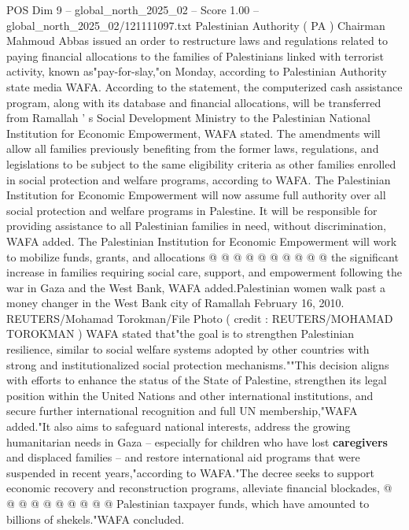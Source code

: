 \begin{textsample}{POS Dim 9 – global\_north\_2025\_02 – Score 1.00 – global\_north\_2025\_02/121111097.txt}  \label{ex:f9_pos_443}
Palestinian Authority ( PA ) Chairman Mahmoud Abbas issued an order to restructure laws and regulations related to paying financial allocations to the families of Palestinians linked with terrorist activity, known as"pay-for-slay,"on Monday, according to Palestinian Authority state media WAFA.
According to the statement, the computerized cash assistance program, along with its database and financial allocations, will be transferred from Ramallah ' s Social Development Ministry to the Palestinian National Institution for Economic Empowerment, WAFA stated.
The amendments will allow all families previously benefiting from the former laws, regulations, and legislations to be subject to the same eligibility criteria as other families enrolled in social protection and welfare programs, according to WAFA.
The Palestinian Institution for Economic Empowerment will now assume full authority over all social protection and welfare programs in Palestine.
It will be responsible for providing assistance to all Palestinian families in need, without discrimination, WAFA added.
The Palestinian Institution for Economic Empowerment will work to mobilize funds, grants, and allocations @ @ @ @ @ @ @ @ @ @ the significant increase in families requiring social care, support, and empowerment following the war in Gaza and the West Bank, WAFA added.Palestinian women walk past a money changer in the West Bank city of Ramallah February 16, 2010.
REUTERS/Mohamad Torokman/File Photo ( credit : REUTERS/MOHAMAD TOROKMAN ) WAFA stated that"the goal is to strengthen Palestinian resilience, similar to social welfare systems adopted by other countries with strong and institutionalized social protection mechanisms.""This decision aligns with efforts to enhance the status of the State of Palestine, strengthen its legal position within the United Nations and other international institutions, and secure further international recognition and full UN membership,"WAFA added."It also aims to safeguard national interests, address the growing humanitarian needs in Gaza -- especially for children who have lost \textbf{caregivers} and displaced families -- and restore international aid programs that were suspended in recent years,"according to WAFA."The decree seeks to support economic recovery and reconstruction programs, alleviate financial blockades, @ @ @ @ @ @ @ @ @ @ Palestinian taxpayer funds, which have amounted to billions of shekels."WAFA concluded.

\end{textsample}
